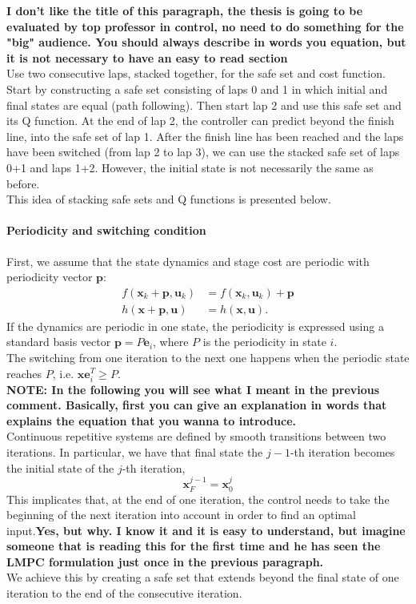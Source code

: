 {\bfseries{I don't like the title of this paragraph, the thesis is going to be evaluated by top professor in control, no need to do something for the "big" audience. You should always describe in words you equation, but it is not necessary to have an easy to read section}} \\
Use two consecutive laps, stacked together, for the safe set and cost function.\\
Start by constructing a safe set consisting of laps 0 and 1 in which initial and final states are equal (path following). Then start lap 2 and use this safe set and its Q function. At the end of lap 2, the controller can predict beyond the finish line, into the safe set of lap 1. After the finish line has been reached and the laps have been switched (from lap 2 to lap 3), we can use the stacked safe set of laps 0+1 and laps 1+2. However, the initial state is not necessarily the same as before.\\
This idea of stacking safe sets and Q functions is presented below.
\paragraph{Periodicity and switching condition} First, we assume that the state dynamics and stage cost are periodic with periodicity vector $\bm{p}$:
\begin{align}
f(\bm{x}_k+\bm{p},\bm{u}_k) &= f(\bm{x}_k,\bm{u}_k)+\bm{p}\\
h(\bm{x}+\bm{p},\bm{u}) &= h(\bm{x},\bm{u}).
\end{align}
If the dynamics are periodic in one state, the periodicity is expressed using a standard basis vector $\bm{p}=P\bm{e}_i$, where $P$ is the periodicity in state $i$.\\
The switching from one iteration to the next one happens when the periodic state reaches $P$, i.e. $\bm{xe}_i^T\geq P$.\\
{\bfseries{NOTE: In the following you will see what I meant in the previous comment. Basically, first you can give an explanation in words that explains the equation that you wanna to introduce.}}\\
Continuous repetitive systems are defined by smooth transitions between two iterations. In particular, we have that final state the $j-1$-th iteration becomes the initial state of the $j$-th iteration,
\begin{equation}
	\bm{x}_{F}^{j-1} = \bm{x}_{0}^{j}
\end{equation}
 This implicates that, at the end of one iteration, the control needs to take the beginning of the next iteration into account in order to find an optimal input.{\bfseries{Yes, but why. I know it and it is easy to understand, but imagine someone that is reading this for the first time and he has seen the LMPC formulation just once in the previous paragraph.}}\\
We achieve this by creating a safe set that extends beyond the final state of one iteration to the end of the consecutive iteration.

